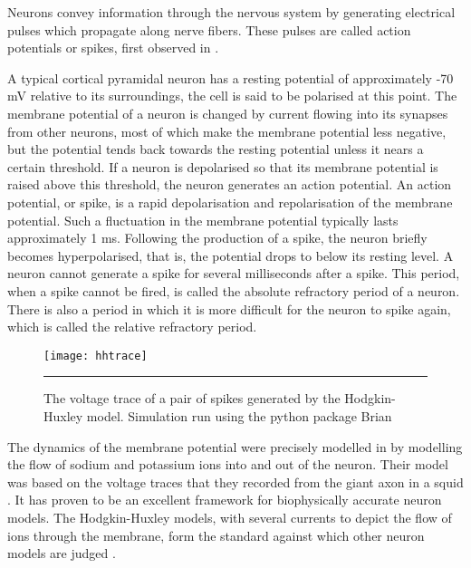 Neurons convey information through the nervous system by generating
electrical pulses which propagate along nerve fibers.  These pulses are
called action potentials or spikes, first observed in \citep{DuBoisReymond1884a}.  

A typical cortical pyramidal neuron has a resting potential of approximately -70 mV relative to
its surroundings, the cell is said to be polarised at this point.
The membrane potential of a neuron is changed by current
flowing into its synapses from other neurons, most of which make the membrane potential less negative, but the potential tends back towards the resting potential
unless it nears a certain threshold. If a neuron
is depolarised so that its membrane potential is raised above this
threshold, the neuron generates an action potential. An action potential, or 
spike, is a rapid depolarisation and repolarisation of the membrane potential.  Such a fluctuation in the membrane potential typically lasts 
approximately 1 ms. Following the production of a spike, the neuron briefly 
becomes hyperpolarised, that is, the potential drops to below its resting level. A neuron cannot generate a spike for several milliseconds after a spike. This period, when a spike cannot be fired, is
called the absolute refractory period of a neuron.  There is also a period in which
it is more difficult for the neuron to spike again, which is called
the relative refractory period. 

\begin{figure}[htb]
\texttt{[image: hhtrace]}
\bigskip
\rule{33em}{0.5pt}
\caption{The voltage trace of a pair of spikes generated by the Hodgkin-Huxley model.  Simulation run using the python package Brian \citep{GoodmanBrette2008a}}
\end{figure}

The dynamics of the membrane potential were precisely modelled in \citep{HodgkinHuxley1952a} by modelling the flow of sodium and potassium ions into and out of the neuron.  Their model was based on the voltage traces that they recorded from the giant axon in a squid \citep{HodgkinHuxley1939a}. It has proven to be an excellent framework for biophysically accurate neuron models. The Hodgkin-Huxley models, with several currents to depict the flow of ions through the membrane, form the standard against which other neuron models are judged \citep{Izhikevich2004a}.

